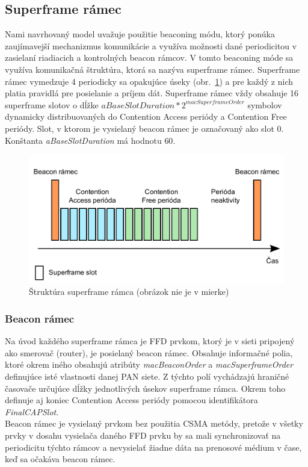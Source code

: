 \subsection{Superframe rámec}
\indent\indent Nami navrhovaný model uvažuje použitie beaconing módu, ktorý ponúka zaujímavejší mechanizmus komunikácie a využíva možnosti dané periodicitou v zasielaní riadiacich a kontrolných beacon rámcov. V tomto beaconing móde sa využíva komunikačná štruktúra, ktorá sa nazýva superframe rámec. Superframe rámec vymedzuje 4 periodicky sa opakujúce úseky (obr.~\ref{fig:superframe}) a pre každý z nich platia pravidlá pre posielanie a príjem dát. Superframe rámec vždy obsahuje 16 superframe slotov o dĺžke $aBaseSlotDuration * 2^{macSuperframeOrder}$ symbolov dynamicky distribuovaných do Contention Access periódy a Contention Free periódy. Slot, v ktorom je vysielaný beacon rámec je označovaný ako slot 0. Konštanta \textit{aBaseSlotDuration} má hodnotu $60$.\\

\begin{figure}[htbp]
\begin{center}
\includegraphics[width=140mm]{figures/superframe}
\caption{Štruktúra superframe rámca (obrázok nie je v mierke)}
\label{fig:superframe}
\end{center}
\end{figure}

\subsubsection{Beacon rámec}
\indent\indent Na úvod každého superframe rámca je FFD prvkom, ktorý je v sieti pripojený ako smerovač (router), je posielaný beacon rámec. Obsahuje informačné polia, ktoré okrem iného obsahujú atribúty \textit{macBeaconOrder} a \textit{macSuperframeOrder} definujúce isté vlastnosti danej PAN siete. Z týchto polí vychádzajú hraničné časovače určujúce dĺžky jednotlivých úsekov superframe rámca. Okrem toho definuje aj koniec Contention Access periódy pomocou identifikátora \textit{FinalCAPSlot}.\\
\indent Beacon rámec je vysielaný prvkom bez použitia CSMA metódy, pretože v všetky prvky v dosahu vysielača daného FFD prvku by sa mali synchronizovať na periodicitu týchto rámcov a nevysielať žiadne dáta na prenosové médium v čase, keď sa očakáva beacon rámec.\\

